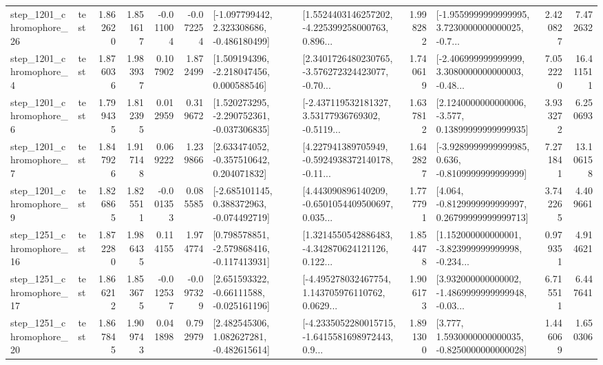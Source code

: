 \begin{tabular}{llrrrrllrlrr}
 step\_1201\_chromophore\_26 &      test &      1.862620 &    1.851617 &     -0.011004 & -0.072254 &   [-1.097799442, 2.323308686, -0.486180499] &  [1.5524403146257202, -4.225399258000763, 0.896... &       1.998282 &  [-1.9559999999999995, 3.7230000000000025, -0.7... &            2.420827 &          7.472632 \\
  step\_1201\_chromophore\_4 &      test &      1.876036 &    1.983937 &      0.107902 &  1.872499 &    [1.509194396, -2.218047456, 0.000588546] &  [2.3401726480230765, -3.576272324423077, -0.70... &       1.740619 &  [-2.406999999999999, 3.3080000000000003, -0.48... &            7.052220 &         16.411511 \\
  step\_1201\_chromophore\_6 &      test &      1.799435 &    1.812395 &      0.012959 &  0.319672 &   [1.520273295, -2.290752361, -0.037306835] &  [-2.437119532181327, 3.53177936769302, -0.5119... &       1.637812 &  [2.1240000000000006, -3.577, 0.13899999999999935] &            3.933272 &          6.250693 \\
  step\_1201\_chromophore\_7 &      test &      1.847926 &    1.917148 &      0.069222 &  1.239866 &    [2.633474052, -0.357510642, 0.204071832] &  [4.227941389705949, -0.5924938372140178, -0.11... &       1.642827 &  [-3.9289999999999985, 0.636, -0.8109999999999999] &            7.271841 &         13.106158 \\
  step\_1201\_chromophore\_9 &      test &      1.826865 &    1.825511 &     -0.001353 &  0.085585 &   [-2.685101145, 0.388372963, -0.074492719] &  [4.443090896140209, -0.6501054409500697, 0.035... &       1.777791 &  [4.064, -0.8129999999999997, 0.26799999999999713] &            3.742265 &          4.409661 \\
 step\_1251\_chromophore\_16 &      test &      1.872280 &    1.986435 &      0.114155 &  1.974774 &   [0.798578851, -2.579868416, -0.117413931] &  [1.3214550542886483, -4.342870624121126, 0.122... &       1.854478 &  [1.152000000000001, -3.823999999999998, -0.234... &            0.979351 &          4.914621 \\
 step\_1251\_chromophore\_17 &      test &      1.866212 &    1.853675 &     -0.012537 & -0.097329 &    [2.651593322, -0.66111588, -0.025161196] &  [-4.495278032467754, 1.143705976110762, 0.0629... &       1.906173 &  [3.932000000000002, -1.4869999999999948, -0.03... &            6.715511 &          6.447641 \\
 step\_1251\_chromophore\_20 &      test &      1.867845 &    1.909743 &      0.041898 &  0.792979 &    [2.482545306, 1.082627281, -0.482615614] &  [-4.2335052280015715, -1.6415581698972443, 0.9... &       1.891300 &   [3.777, 1.5930000000000035, -0.8250000000000028] &            1.446069 &          1.650306 \\

\end{tabular}
